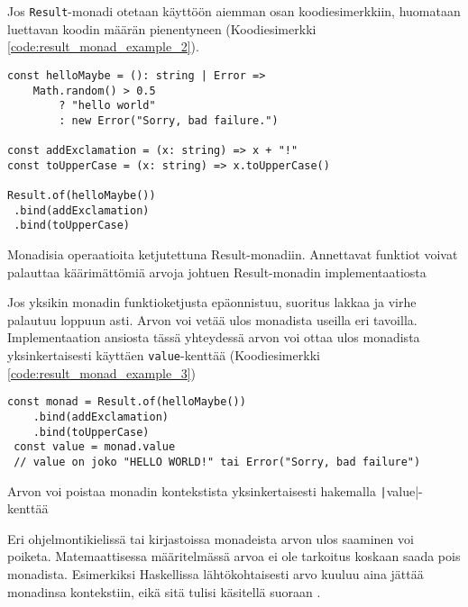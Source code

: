 Jos \texttt{Result}-monadi otetaan käyttöön aiemman osan koodiesimerkkiin, huomataan luettavan koodin määrän pienentyneen (Koodiesimerkki \ref{code:result_monad_example_2}).

\begin{code}
    \begin{verbatim}
const helloMaybe = (): string | Error => 
    Math.random() > 0.5 
        ? "hello world" 
        : new Error("Sorry, bad failure.")

const addExclamation = (x: string) => x + "!"
const toUpperCase = (x: string) => x.toUpperCase()

Result.of(helloMaybe())
 .bind(addExclamation)
 .bind(toUpperCase)
\end{verbatim}
    \caption{Monadisia operaatioita ketjutettuna Result-monadiin. Annettavat funktiot voivat palauttaa käärimättömiä arvoja johtuen Result-monadin implementaatiosta}
    \label{code:result_monad_example_2}
\end{code}

Jos yksikin monadin funktioketjusta epäonnistuu, suoritus lakkaa ja virhe palautuu loppuun asti. Arvon voi vetää ulos monadista useilla eri tavoilla. Implementaation ansiosta tässä yhteydessä arvon voi ottaa ulos monadista yksinkertaisesti käyttäen \texttt{value}-kenttää (Koodiesimerkki \ref{code:result_monad_example_3})


\begin{code}
    \begin{verbatim}
const monad = Result.of(helloMaybe())
    .bind(addExclamation)
    .bind(toUpperCase)
 const value = monad.value
 // value on joko "HELLO WORLD!" tai Error("Sorry, bad failure")
\end{verbatim}
    \caption{Arvon voi poistaa monadin kontekstista yksinkertaisesti hakemalla \texttt|value|-kenttää }
    \label{code:result_monad_example_3}
\end{code}

Eri ohjelmontikielissä tai kirjastoissa monadeista arvon ulos saaminen voi poiketa. Matemaattisessa määritelmässä arvoa ei ole tarkoitus koskaan saada pois monadista. Esimerkiksi Haskellissa lähtökohtaisesti arvo kuuluu aina jättää monadinsa kontekstiin, eikä sitä tulisi käsitellä suoraan \cite{haskellallmonad}.
